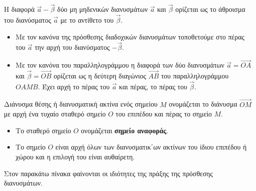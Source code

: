 \documentclass[twoside,nofonts,internet,shmeiwseis]{thewria}
\begin{document}
Η διαφορά $ \vec{a}-\vec{\beta} $ δύο μη μηδενικών διανυσμάτων $ \vec{a} $ και $ \vec{\beta} $ ορίζεται ως το άθροισμα του διανύσματος $ \vec{a} $ με το αντίθετο του $ \vec{\beta} $.
\begin{center}
\end{center}
\begin{itemize}[itemsep=0mm]
\item Με τον κανόνα της πρόσθεσης διαδοχικών διανυσμάτων τοποθετούμε στο πέρας του $ \vec{a} $ την αρχή του διανύσματος $ -\vec{\beta} $.
\item Με τον κανόνα του παραλληλογράμμου η διαφορά των δύο διανυσμάτων $ \vec{a}=\overrightarrow{OA} $ και $ \vec{\beta}=\overrightarrow{OB} $ ορίζεται ως η δεύτερη διαγώνιος $ \overrightarrow{AB} $ του παραλληλογράμμου $ OAMB $. Έχει αρχή το πέρας του $ \vec{a} $ και πέρας, το πέρας του $ \vec{\beta} $.
\end{itemize}
Διάνυσμα θέσης ή διανυσματική ακτίνα ενός σημείου $ M $ ονομάζεται το διάνυσμα $ \overrightarrow{OM} $ με αρχή ένα τυχαίο σταθερό σημείο $ O $ του επιπέδου και πέρας το σημείο $ M $.
\begin{itemize}[itemsep=0mm]
\item Το σταθερό σημείο $ O $ ονομάζεται \textbf{σημείο αναφοράς}.
\item Το σημείο $ O $ είναι αρχή όλων των διανυσματικ΄ων ακτίνων του ίδιου επιπέδου ή χώρου και η επιλογή του είναι αυθαίρετη.
\end{itemize}
\thewrhmata
{}
Στον παρακάτω πίνακα φαίνονται οι ιδιότητες της πράξης της πρόσθεσης διανυσμάτων.\\
\end{document}
